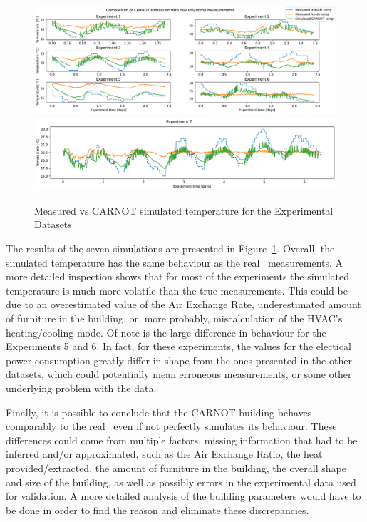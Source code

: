 \begin{figure}[ht]
    \centering
    \includegraphics[width = \textwidth]{Plots/CARNOT_comparison_1.pdf}
    \includegraphics[width = \textwidth]{Plots/CARNOT_comparison_2.pdf}
    \caption{Measured vs CARNOT simulated temperature for the Experimental
    Datasets}
    \label{fig:CARNOT_simulation_validation}
\end{figure}

The results of the seven simulations are presented in
Figure~\ref{fig:CARNOT_simulation_validation}. Overall, the simulated
temperature has the same behaviour as the real \pdome\ measurements. A more
detailed inspection shows that for most of the experiments the simulated
temperature is much more volatile than the true measurements. This could be due
to an overestimated value of the Air Exchange Rate, underestimated amount of
furniture in the building, or, more probably, miscalculation of the HVAC's
heating/cooling mode. Of note is the large difference in behaviour for the
Experiments 5 and 6. In fact, for these experiments, the values for the
electical power consumption greatly differ in shape from the ones presented in
the other datasets, which could potentially mean erroneous measurements, or some
other underlying problem with the data.

Finally, it is possible to conclude that the CARNOT building behaves comparably
to the real \pdome\, even if not perfectly simulates its behaviour. These
differences  could come from multiple factors, missing information that had to
be inferred and/or approximated, such as the Air Exchange Ratio, the heat
provided/extracted, the amount of furniture in the building, the overall shape
and size of the building, as well as possibly errors in the experimental data
used for validation. A more detailed analysis of the building parameters would
have to be done in order to find the reason and eliminate these discrepancies.


\clearpage
